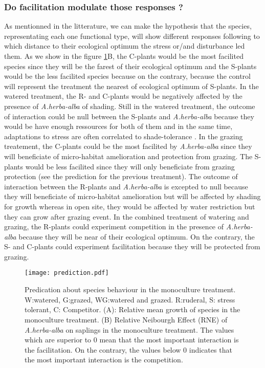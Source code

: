 \documentclass[12pt]{article} %
\begin{document}
\subsubsection{Do facilitation modulate those responses ?}
As mentionned in the litterature, we can make the hypothesis that the species, representating each one functional type, will show different responses following to which distance to their ecological optimum the stress or/and disturbance led them. As we show in the figure \ref{pred}B, the C-plants would be the most facilited species since they will be the farest of their ecological optimum and the S-plants would be the less facilited species because on the contrary, because the control will represent the treatment the nearest of ecological optimum of S-plants. In the watered treatment, the R- and C-plants would be negatively affected by the presence of \textit{A.herba-alba} of shading. Still in the watered treatment, the outcome of interaction could be null between the S-plants and \textit{A.herba-alba} because they would be have enough ressources for both of them and in the same time, adaptations to stress are often correlated to shade-tolerance \citep{Grime1977a}. In the grazing treatement, the C-plants could be the most facilited by \textit{A.herba-alba} since they will beneficiate of micro-habitat amelioration and protection from grazing. The S-plants would be less facilited since they will only beneficiate from grazing protection (see the prediction for the previous treatment). The outcome of interaction between the R-plants and \textit{A.herba-alba} is excepted to null because they will beneficiate of micro-habitat amelioration but will be affected by shading for growth whereas in open site, they would be affected by water restriction but they can grow after grazing event. In the combined treatment of watering and grazing, the R-plants could experiment competition in the presence of \textit{A.herba-alba} because they will be near of their ecological optimum. On the contrary, the S- and C-plants could experiment facilitation because they will be protected from grazing.
\begin{figure} %
\begin{center}
\texttt{[image: prediction.pdf]}
\end{center}
\caption{Predication about species behaviour in the monoculture treatment. W:watered, G:grazed, WG:watered and grazed. R:ruderal, S: stress tolerant, C: Competitor. (A): Relative mean growth of species in the monoculture treatment. (B) Relative Neibourgh Effect (RNE) of \textit{A.herba-alba} on saplings in the monoculture treatment. The values which are superior to 0 mean that the most important interaction is the facilitation. On the contrary, the values below 0 indicates that the most important interaction is the competition.\label{pred}}
\end{figure}
\end{document}
